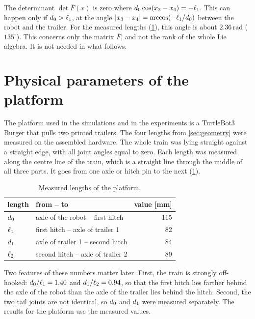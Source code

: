 The determinant $\det\bar F(x)$ is zero where $d_0\cos(x_3-x_4)=-\ell_1$. This
can happen only if $d_0>\ell_1$, at the angle
$|x_3-x_4|=\arccos(-\ell_1/d_0)$ between the robot and the trailer. For the
measured lengths (\cref{sec:parameters}), this angle is about $2.36\,\mathrm{rad}$
($135^\circ$). This concerns only the matrix $\bar F$, and not the rank of the
whole Lie algebra. It is not needed in what follows.

\section{Physical parameters of the platform}
\label{sec:parameters}

The platform used in the simulations and in the experiments is a TurtleBot3
Burger that pulls two printed trailers. The four lengths from \cref{sec:geometry}
were measured on the assembled hardware. The whole train was lying straight
against a straight edge, with all joint angles equal to zero. Each length was
measured along the centre line of the train, which is a straight line through
the middle of all three parts. It goes from one axle or hitch pin to the next
(\cref{tab:geometry-values}).

\begin{table}[ht]
  \centering
  \caption{Measured lengths of the platform.}
  \label{tab:geometry-values}
  \begin{tabular}{llr}
    \toprule
    length & from -- to & value [mm]\\
    \midrule
    $d_0$ & axle of the robot -- first hitch & 115\\
    $\ell_1$  & first hitch -- axle of trailer 1 & 82\\
    $d_1$  & axle of trailer 1 -- second hitch & 84\\
    $\ell_2$  & second hitch -- axle of trailer 2 & 89\\
    \bottomrule
  \end{tabular}
\end{table}

Two features of these numbers matter later. First, the train is strongly
off-hooked: $d_0/\ell_1=1.40$ and $d_1/\ell_2=0.94$, so that the first hitch lies
farther behind the axle of the robot than the axle of the trailer lies behind
the hitch. Second, the two tail joints are not identical, so $d_0$
and $d_1$ were measured separately. The results for the platform use the measured values.
